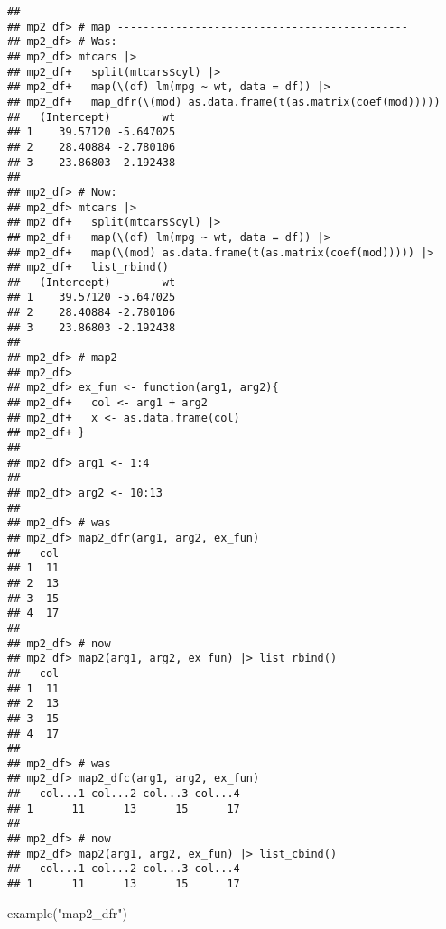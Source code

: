 \documentclass[
]{book}
\newenvironment{Shaded}{\begin{snugshade}}{\end{snugshade}}
\newcommand{\FunctionTok}[1]{\textcolor[rgb]{0.00,0.00,0.00}{#1}}
\newcommand{\NormalTok}[1]{#1}
\newcommand{\StringTok}[1]{\textcolor[rgb]{0.31,0.60,0.02}{#1}}
\begin{document}
\begin{verbatim}
## 
## mp2_df> # map ---------------------------------------------
## mp2_df> # Was:
## mp2_df> mtcars |>
## mp2_df+   split(mtcars$cyl) |>
## mp2_df+   map(\(df) lm(mpg ~ wt, data = df)) |>
## mp2_df+   map_dfr(\(mod) as.data.frame(t(as.matrix(coef(mod)))))
##   (Intercept)        wt
## 1    39.57120 -5.647025
## 2    28.40884 -2.780106
## 3    23.86803 -2.192438
## 
## mp2_df> # Now:
## mp2_df> mtcars |>
## mp2_df+   split(mtcars$cyl) |>
## mp2_df+   map(\(df) lm(mpg ~ wt, data = df)) |>
## mp2_df+   map(\(mod) as.data.frame(t(as.matrix(coef(mod))))) |>
## mp2_df+   list_rbind()
##   (Intercept)        wt
## 1    39.57120 -5.647025
## 2    28.40884 -2.780106
## 3    23.86803 -2.192438
## 
## mp2_df> # map2 ---------------------------------------------
## mp2_df> 
## mp2_df> ex_fun <- function(arg1, arg2){
## mp2_df+   col <- arg1 + arg2
## mp2_df+   x <- as.data.frame(col)
## mp2_df+ }
## 
## mp2_df> arg1 <- 1:4
## 
## mp2_df> arg2 <- 10:13
## 
## mp2_df> # was
## mp2_df> map2_dfr(arg1, arg2, ex_fun)
##   col
## 1  11
## 2  13
## 3  15
## 4  17
## 
## mp2_df> # now
## mp2_df> map2(arg1, arg2, ex_fun) |> list_rbind()
##   col
## 1  11
## 2  13
## 3  15
## 4  17
## 
## mp2_df> # was
## mp2_df> map2_dfc(arg1, arg2, ex_fun)
##   col...1 col...2 col...3 col...4
## 1      11      13      15      17
## 
## mp2_df> # now
## mp2_df> map2(arg1, arg2, ex_fun) |> list_cbind()
##   col...1 col...2 col...3 col...4
## 1      11      13      15      17
\end{verbatim}

\begin{Shaded}
\begin{Highlighting}[]
\FunctionTok{example}\NormalTok{(}\StringTok{"map2\_dfr"}\NormalTok{)}
\end{Highlighting}
\end{Shaded}
\end{document}
